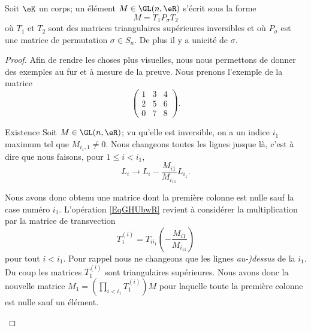 \begin{theorem}    \label{ThoizlYJO}
    Soit \( \eK\) un corps; un élément \( M\in\GL(n,\eR)\) s'écrit sous la forme
    \begin{equation}
        M=T_1P_{\sigma}T_2
    \end{equation}
    où \( T_1\) et \( T_2\) sont des matrices triangulaires supérieures inversibles et où \( P_{\sigma}\) est une matrice de permutation \( \sigma\in S_n\). De plus il y a unicité de \( \sigma\).
\end{theorem}

\begin{proof}
    Afin de rendre les choses plus visuelles, nous nous permettons de donner des exemples au fur et à mesure de la preuve. Nous prenons l'exemple de la matrice
    \begin{equation}
        \begin{pmatrix}
            1    &   3    &   4    \\
            2    &   5    &   6    \\
            0    &   7    &   8
        \end{pmatrix}.
    \end{equation}
    \begin{subproof}
    \item[Existence]
        Soit \( M\in \GL(n,\eR)\); vu qu'elle est inversible, on a un indice \( i_1\) maximum tel que \( M_{i_1,1}\neq 0\). Nous changeons toutes les lignes jusque là, c'est à dire que nous faisons, pour \( 1\leq i< i_1\),
        \begin{equation}        \label{EqGHUbwR}
            L_i\to L_i-\frac{ M_{i1} }{ M_{i_11} }L_{i_1}.
        \end{equation}

        Nous avons donc obtenu une matrice dont la première colonne est nulle sauf la case numéro \( i_1\). L'opération \eqref{EqGHUbwR} revient à considérer la multiplication par la matrice de transvection
        \begin{equation}
            T_1^{(i)}=T_{ii_1}\left( -\frac{ M_{i1} }{ M_{i_11} } \right)
        \end{equation}
        pour tout \( i<i_1\). Pour rappel nous ne changeons que les lignes \emph{au-)dessus} de la \( i_1\). Du coup les matrices \( T^{(i)}_1\) sont triangulaires supérieures. Nous avons donc la nouvelle matrice \( M_1=\left( \prod_{i<i_1}T_1^{(i)} \right)M\) pour laquelle toute la première colonne est nulle sauf un élément.


\end{subproof}
\end{proof}
